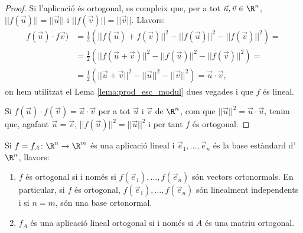 \begin{proof}
Si l'aplicació és ortogonal, es compleix que, per a tot $\vec u,\vec v \in \R^n$, $||f(\vec u)||=||\vec u||$ i $||f(\vec v)||=||\vec v||$. Llavors:
\begin{align*}
    f(\vec u)\cdot f\vec v) & = \frac{1}{2}\left(||f(\vec u) +f(\vec v)||^2 - ||f(\vec u)||^2 - ||f(\vec v)||^2\right) = \\
    & = \frac{1}{2}\left(||f(\vec u+\vec v)||^2 - ||f(\vec u)||^2 - ||f(\vec v)||^2\right) = \\
     & = \frac{1}{2}\left(||\vec u + \vec v||^2 - ||\vec u||^2 - ||\vec v||^2\right) = \vec u \cdot \vec v  ,
\end{align*}
on hem utilitzat el Lema \ref{lema:prod_esc_modul} dues vegades i que $f$ és lineal.

Si $f(\vec u)\cdot f(\vec v)=\vec u \cdot \vec v$ per a tot $\vec u$ i $\vec v$ de $\R^n$, com que $||\vec u||^2=\vec u \cdot \vec u$, tenim que, agafant $\vec u=\vec v$, $||f(\vec u)||^2=||\vec u||^2$ i per tant $f$ és ortogonal.
\end{proof}
\begin{corollari}
Si $f = f_A \colon \R^n \to \R^m$ és una aplicació lineal i $\vec e_1, \dots, \vec e_n$ és la base estàndard d'$\R^n$, llavors:
\begin{enumerate}[\rm (a)]
    \item $f$ és ortogonal si i només si $f(\vec e_1), \dots, f(\vec e_n)$ són vectors ortonormals. En particular, si $f$ és ortogonal, $f(\vec e_1), \dots, f(\vec e_n)$ són linealment independents i si $n=m$, són una base ortonormal.
    \item $f_A$ és una aplicació lineal ortogonal si i només si $A$ és una matriu ortogonal.
\end{enumerate}
\end{corollari}

